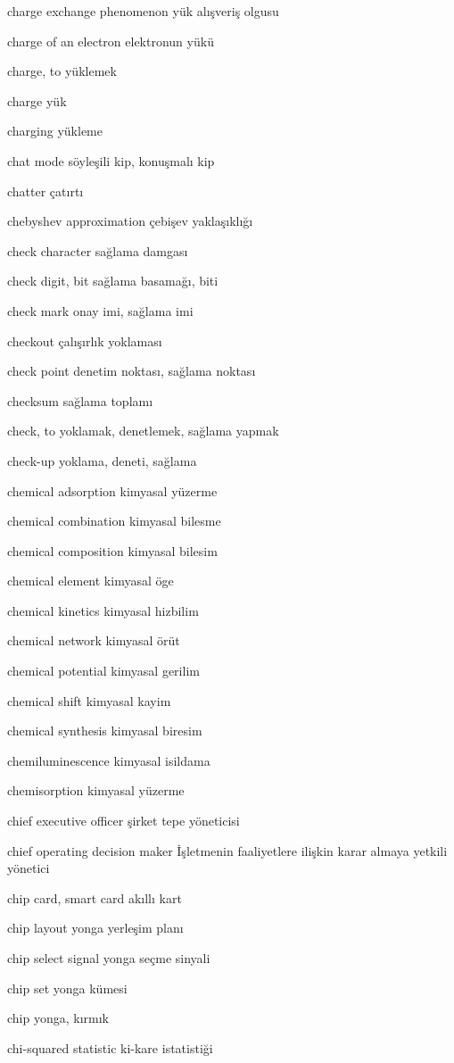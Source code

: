 \documentclass[12pt,fleqn]{article}\usepackage{../../common}
\begin{document}
charge exchange phenomenon yük alışveriş olgusu

charge of an electron elektronun yükü

charge, to yüklemek

charge yük

charging yükleme

chat mode söyleşili kip, konuşmalı kip

chatter çatırtı

chebyshev approximation çebişev yaklaşıklığı

check character sağlama damgası

check digit, bit sağlama basamağı, biti

check mark onay imi, sağlama imi

checkout çalışırlık yoklaması

check point denetim noktası, sağlama noktası

checksum sağlama toplamı

check, to yoklamak, denetlemek, sağlama yapmak

check-up yoklama, deneti, sağlama

chemical adsorption kimyasal yüzerme

chemical combination kimyasal bilesme

chemical composition kimyasal bilesim

chemical element kimyasal öge

chemical kinetics kimyasal hizbilim

chemical network kimyasal örüt

chemical potential kimyasal gerilim

chemical shift kimyasal kayim

chemical synthesis kimyasal biresim

chemiluminescence kimyasal isildama

chemisorption kimyasal yüzerme

chief executive officer şirket tepe yöneticisi

chief operating decision maker İşletmenin faaliyetlere ilişkin karar almaya yetkili yönetici

chip card, smart card akıllı kart

chip layout yonga yerleşim planı

chip select signal yonga seçme sinyali

chip set yonga kümesi

chip yonga, kırmık

chi-squared statistic ki-kare istatistiği
\end{document}
